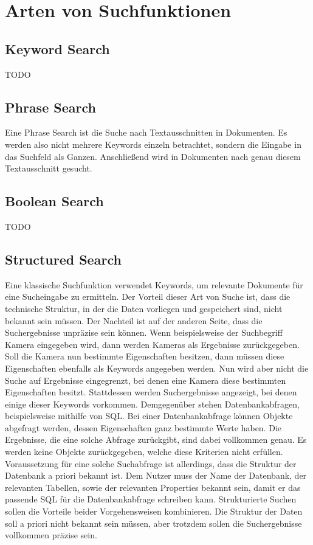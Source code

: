 \chapter{Arten von Suchfunktionen}

\section{Keyword Search}
TODO

\section{Phrase Search}
Eine Phrase Search ist die Suche nach Textausschnitten in Dokumenten. Es werden also nicht mehrere Keywords einzeln betrachtet, sondern die Eingabe in das Suchfeld als Ganzen. Anschließend wird in Dokumenten nach genau diesem Textausschnitt gesucht.

\section{Boolean Search}
TODO

\section{Structured Search}
Eine klassische Suchfunktion verwendet Keywords, um relevante Dokumente für eine Sucheingabe zu ermitteln. Der Vorteil dieser Art von Suche ist, dass die technische Struktur, in der die Daten vorliegen und gespeichert sind, nicht bekannt sein müssen. Der Nachteil ist auf der anderen Seite, dass die Suchergebnisse unpräzise sein können. Wenn beispielsweise der Suchbegriff Kamera eingegeben wird, dann werden Kameras als Ergebnisse zurückgegeben. Soll die Kamera nun bestimmte Eigenschaften besitzen, dann müssen diese Eigenschaften ebenfalls als Keywords angegeben werden. Nun wird aber nicht die Suche auf Ergebnisse eingegrenzt, bei denen eine Kamera diese bestimmten Eigenschaften besitzt. Stattdessen werden Suchergebnisse angezeigt, bei denen einige dieser Keywords vorkommen.
Demgegenüber stehen Datenbankabfragen, beispielsweise mithilfe von SQL. Bei einer Datenbankabfrage können Objekte abgefragt werden, dessen Eigenschaften ganz bestimmte Werte haben. Die Ergebnisse, die eine solche Abfrage zurückgibt, sind dabei vollkommen genau. Es werden keine Objekte zurückgegeben, welche diese Kriterien nicht erfüllen. Voraussetzung für eine solche Suchabfrage ist allerdings, dass die Struktur der Datenbank a priori bekannt ist. Dem Nutzer muss der Name der Datenbank, der relevanten Tabellen, sowie der relevanten Properties bekannt sein, damit er das passende SQL für die Datenbankabfrage schreiben kann.
Strukturierte Suchen sollen die Vorteile beider Vorgehensweisen kombinieren. Die Struktur der Daten soll a priori nicht bekannt sein müssen, aber trotzdem sollen die Suchergebnisse vollkommen präzise sein. 

